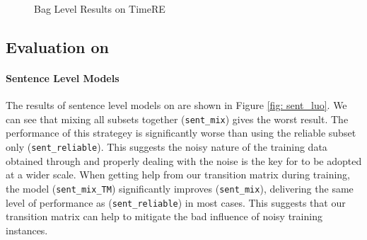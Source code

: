 \begin{figure}[htbp]
\centering
{}
\caption{Bag Level Results on TimeRE}
\label{fig: results_on_luo}
\end{figure}

\subsection{Evaluation on \TimeRE}
\paragraph{Sentence Level Models}
The results of sentence level models on \TimeRE are shown in Figure \ref{fig:
sent_luo}. We can see that mixing all subsets together (\texttt{sent\_mix})
gives the worst result. The performance of this strategey is significantly
worse than using the reliable subset only (\texttt{sent\_reliable}). This
suggests the noisy nature of the training data obtained through \DS and
properly dealing with the noise is the key for \DS to be adopted at a wider
scale. When getting help from our transition matrix during training, the
model (\texttt{sent\_mix\_TM}) significantly improves (\texttt{sent\_mix}),
delivering the same level of performance as (\texttt{sent\_reliable}) in most
cases. This suggests that our transition matrix can help to mitigate the bad influence of noisy training instances.


